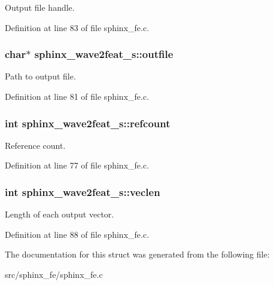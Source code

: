 Output file handle. 



Definition at line 83 of file sphinx\-\_\-fe.\-c.

\subsubsection[{outfile}]{\setlength{\rightskip}{0pt plus 5cm}char$\ast$ sphinx\-\_\-wave2feat\-\_\-s\-::outfile}\label{structsphinx__wave2feat__s_aa50405dc75074933912da57295ec5fbf}


Path to output file. 



Definition at line 81 of file sphinx\-\_\-fe.\-c.

\subsubsection[{refcount}]{\setlength{\rightskip}{0pt plus 5cm}int sphinx\-\_\-wave2feat\-\_\-s\-::refcount}\label{structsphinx__wave2feat__s_ae9b2fc4bfa6a3adbf2ee5a71796cdb51}


Reference count. 



Definition at line 77 of file sphinx\-\_\-fe.\-c.

\subsubsection[{veclen}]{\setlength{\rightskip}{0pt plus 5cm}int sphinx\-\_\-wave2feat\-\_\-s\-::veclen}\label{structsphinx__wave2feat__s_ad71e5fca7c13ae0258bcee81a6f1fa89}


Length of each output vector. 



Definition at line 88 of file sphinx\-\_\-fe.\-c.



The documentation for this struct was generated from the following file\-:\begin{DoxyCompactItemize}
\item 
src/sphinx\-\_\-fe/sphinx\-\_\-fe.\-c\end{DoxyCompactItemize}

